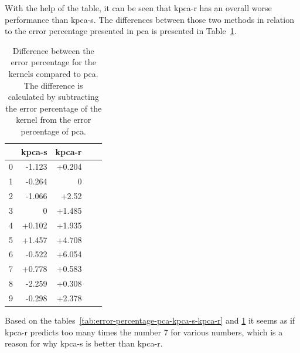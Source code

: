 With the help of the table, it can be seen that \gls{kpca-r} has an overall worse performance than \gls{kpca-s}. The differences between those two methods in relation to the error percentage presented in \gls{pca} is presented in Table~\ref{tab:error-percentage-difference-pca-kpca-s-kpca-r}.

\begin{table}[htb!]
    \centering
    \begin{tabular}{lrrrr}
        \toprule
           & kpca-s & kpca-r    \\
        \midrule
        0  & -1.123  & +0.204   \\
        1  & -0.264  & 0        \\
        2  & -1.066  & +2.52    \\
        3  &  0      & +1.485   \\
        4  & +0.102  & +1.935   \\
        5  & +1.457  & +4.708   \\
        6  & -0.522  & +6.054   \\
        7  & +0.778  & +0.583   \\
        8  & -2.259  &  +0.308  \\
        9  & -0.298  & +2.378   \\
        \bottomrule
    \end{tabular}
    \caption{Difference between the error percentage for the kernels compared to pca. The difference is calculated by subtracting the error percentage of the kernel from the error percentage of pca.}
    \label{tab:error-percentage-difference-pca-kpca-s-kpca-r}
\end{table}

Based on the tables~\ref{tab:error-percentage-pca-kpca-s-kpca-r} and \ref{tab:error-percentage-difference-pca-kpca-s-kpca-r} it seems as if \gls{kpca-r} predicts too many times the number 7 for various numbers, which is a reason for why \gls{kpca-s} is better than \gls{kpca-r}.


